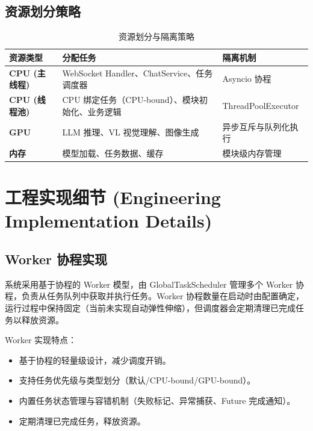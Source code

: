 \documentclass[a4paper,12pt]{article}
\begin{document}
\subsection{资源划分策略}

\begin{table}[H]
\centering
\begin{tabular}{lll}
\toprule
\textbf{资源类型} & \textbf{分配任务} & \textbf{隔离机制} \\
\midrule
\textbf{CPU (主线程)} & WebSocket Handler、ChatService、任务调度器 & Asyncio 协程 \\
\textbf{CPU (线程池)} & CPU 绑定任务（CPU-bound）、模块初始化、业务逻辑 & ThreadPoolExecutor \\
\textbf{GPU} & LLM 推理、VL 视觉理解、图像生成 & 异步互斥与队列化执行 \\
\textbf{内存} & 模型加载、任务数据、缓存 & 模块级内存管理 \\
\bottomrule
\end{tabular}
\caption{资源划分与隔离策略}
\end{table}

\section{工程实现细节 (Engineering Implementation Details)}

\subsection{Worker 协程实现}
系统采用基于协程的 Worker 模型，由 GlobalTaskScheduler 管理多个 Worker 协程，负责从任务队列中获取并执行任务。Worker 协程数量在启动时由配置确定，运行过程中保持固定（当前未实现自动弹性伸缩），但调度器会定期清理已完成任务以释放资源。

Worker 实现特点：
\begin{itemize}
    \item 基于协程的轻量级设计，减少调度开销。
    \item 支持任务优先级与类型划分（默认/CPU-bound/GPU-bound）。
    \item 内置任务状态管理与容错机制（失败标记、异常捕获、Future 完成通知）。
    \item 定期清理已完成任务，释放资源。
\end{itemize}
\end{document}
